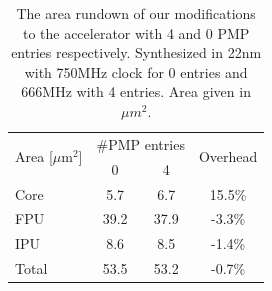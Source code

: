 \begin{table}[tbp]
\centering
\caption{The area rundown of our modifications to the accelerator with 4 and 0 PMP entries respectively. Synthesized in 22nm with 750MHz clock for 0 entries and 666MHz with 4 entries. Area given in $\mu m^2$.}
\label{tab:areasnitch}
\begin{tabular}{@{}lccc@{}}
\toprule
\multirow{2}{*}{Area {[}$\mu$m$^2${]}} & \multicolumn{2}{c}{\#PMP entries} & \multirow{2}{*}{Overhead} \\ & 0                 & 4                 &\\ \midrule
Core   & 5.7               & 6.7               & 15.5\%                    \\
FPU    & 39.2              & 37.9              & -3.3\%                    \\
IPU   & 8.6               & 8.5               & -1.4\%                    \\ \midrule
Total  & 53.5              & 53.2              & -0.7\%                    \\ \bottomrule
\end{tabular}
\end{table}

% 

\setcounter{para}{0}



